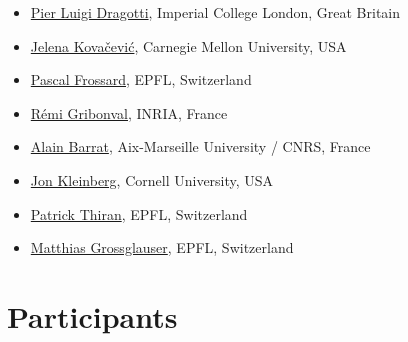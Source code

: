 \documentclass[a4paper]{scrartcl}
\begin{document}
\begin{itemize}
\begin{itemize}
		{Ronald Coifman}, Yale University, USA
	\item \href{http://www.commsp.ee.ic.ac.uk/~pld/}
		{Pier Luigi Dragotti}, Imperial College London, Great Britain
	\item \href{http://jelena.ece.cmu.edu/}
		{Jelena Kovačević}, Carnegie Mellon University, USA
	\item \href{http://people.epfl.ch/pascal.frossard}
		{Pascal Frossard}, EPFL, Switzerland
	\item \href{http://people.irisa.fr/Remi.Gribonval/}
		{Rémi Gribonval}, INRIA, France
	\item \href{http://www.cpt.univ-mrs.fr/~barrat/english.html}
		{Alain Barrat}, Aix-Marseille University / CNRS, France
	\item \href{http://www.cs.cornell.edu/home/kleinber/}
		{Jon Kleinberg}, Cornell University, USA
	\item \href{http://people.epfl.ch/patrick.thiran}
		{Patrick Thiran}, EPFL, Switzerland
	\item \href{http://icapeople.epfl.ch/grossglauser/}
		{Matthias Grossglauser}, EPFL, Switzerland
	\end{itemize}
\end{itemize}

\section{Participants}
\end{document}
